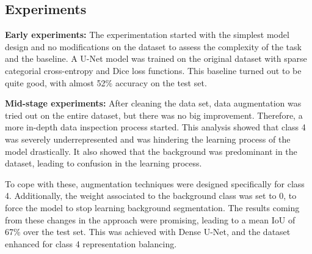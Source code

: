 \documentclass[11pt]{article}
\begin{document}
\begin{multicols}{2}
        


    \section{Experiments}
        \textbf{Early experiments:}
        The experimentation started with the simplest model design and no modifications on the dataset to assess the complexity of the task and the baseline. A U-Net model was trained on the original dataset with sparse categorial cross-entropy and Dice loss functions. This baseline turned out to be quite good, with almost 52\% accuracy on the test set.

        
        \textbf{Mid-stage experiments:}
        After cleaning the data set, data augmentation was tried out on the entire dataset, but there was no big improvement. Therefore, a more in-depth data inspection process started. This analysis showed that class 4 was severely underrepresented and was hindering the learning process of the model drastically. 
        It also showed that the background was predominant in the dataset, leading to confusion in the learning process.

        To cope with these, augmentation techniques were designed specifically for class 4.
        Additionally, the weight associated to the background class was  set to 0, to force the model to stop learning background segmentation.
        The results coming from these changes in the approach were promising, leading to a mean IoU of 67\% over the test set. This was achieved with Dense U-Net, and the dataset enhanced for class 4 representation balancing.
        

\end{multicols}
\end{document}
